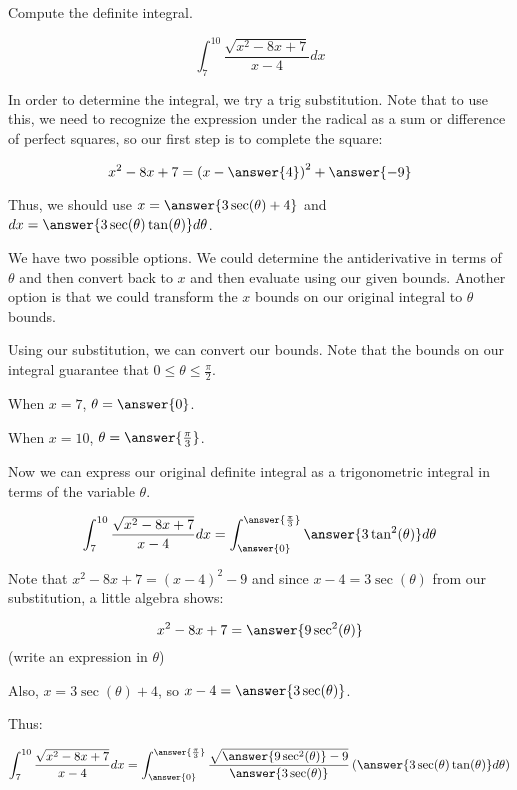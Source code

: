 \documentclass{ximera}
\author{Jim Talamo and Jason Miller}
\begin{document}
\begin{exercise}
Compute the definite integral. 

\[
\int_{7}^{10} \frac{\sqrt{x^{2}-8x+7}}{x-4} dx
\]



In order to determine the integral, we try a trig substitution.  Note that to use this, we need to recognize the expression under the radical as a sum or difference of perfect squares, so our first step is to complete the square:

\[
x^2-8x+7 = \left(x - \answer{4}\right)^2+\answer{-9}
\]

\begin{exercise}
Thus, we should use $x=\answer{3\sec(\theta)+4}$ and $dx= \answer{ 3\sec(\theta)\tan(\theta)} d\theta$. 

We have two possible options. We could determine the antiderivative in terms of $\theta$ 
and then convert back to $x$ and then evaluate using our given bounds. 
Another option is that we could transform the $x$ bounds on our original integral to $\theta$ bounds. 

Using our substitution, we can convert our bounds. Note that the bounds on our integral guarantee that $0\leq \theta \leq \frac{\pi}{2}$. 

When $x=7$, $\theta=\answer{0}$. 

When $x=10$, $\theta=\answer{\frac{\pi}{3}}$. 



\begin{exercise}


Now we can express our original definite integral as a trigonometric integral in terms of the variable $\theta$. 

\[
\int_{7}^{10} \frac{\sqrt{x^{2}-8x+7}}{x-4}  dx= \int_{\answer{0}}^{\answer{\frac{\pi}{3}}}  \answer{3\tan^{2}(\theta)}   d\theta
\]

\begin{hint}
Note that $x^2-8x+7 = (x-4)^2-9$ and since $x-4 = 3 \sec(\theta)$ from our substitution, a little algebra shows:

\[x^2-8x+7 = \answer{9 \sec^2(\theta)}\]
(write an expression in $\theta$)

Also, $x = 3 \sec(\theta)+4$, so $x-4=\answer{3\sec(\theta)}$.

Thus:

\[
\int_{7}^{10} \frac{\sqrt{x^{2}-8x+7}}{x-4}  dx = \int_{\answer{0}}^{\answer{\frac{\pi}{3}}}  \frac{\sqrt{\answer{9 \sec^2(\theta)}-9}}{\answer{3\sec(\theta)}}  \left(\answer{3 \sec(\theta)\tan(\theta)}   d\theta\right)
\]


\end{hint}
\end{exercise}
\end{exercise}
\end{exercise}
\end{document}
